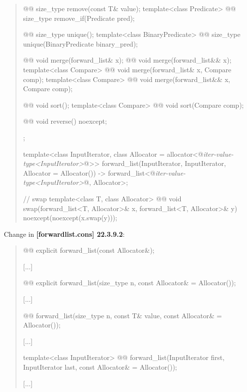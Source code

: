 \documentclass{wg21}
\begin{document}
\begin{quote}
\begin{codeblock}
{{    @@ size_type remove(const T& value);
    template<class Predicate> @@ size_type remove_if(Predicate pred);
    
    @@ size_type unique();
    template<class BinaryPredicate>
    @@ size_type unique(BinaryPredicate binary_pred);
    
    @@ void merge(forward_list& x);
    @@ void merge(forward_list&& x);
    template<class Compare> @@ void merge(forward_list& x, Compare comp);
    template<class Compare> @@ void merge(forward_list&& x, Compare comp);
    
    @@ void sort();
    template<class Compare> @@ void sort(Compare comp);
    
    @@ void reverse() noexcept;
  };

  template<class InputIterator,
           class Allocator = allocator<@\textit{iter-value-type<InputIterator>}@>>
    forward_list(InputIterator, InputIterator, Allocator = Allocator())
      -> forward_list<@\textit{iter-value-type<InputIterator>}@, Allocator>;

  // swap
  template<class T, class Allocator>
    @@ void swap(forward_list<T, Allocator>& x, forward_list<T, Allocator>& y)
      noexcept(noexcept(x.swap(y)));
}
\end{codeblock}%
\end{quote}

Change in \textbf{[forwardlist.cons] 22.3.9.2}:
\begin{quote}
\begin{itemdecl}
@@ explicit forward_list(const Allocator&);
\end{itemdecl}
[...]
\begin{itemdecl}
@@ explicit forward_list(size_type n, const Allocator& = Allocator());
\end{itemdecl}
[...]
\begin{itemdecl}
@@ forward_list(size_type n, const T& value, const Allocator& = Allocator());
\end{itemdecl}
[...]
\begin{itemdecl}
template<class InputIterator>
  @@ forward_list(InputIterator first, InputIterator last,
                             const Allocator& = Allocator());
\end{itemdecl}
[...]
\end{quote}
\end{document}
